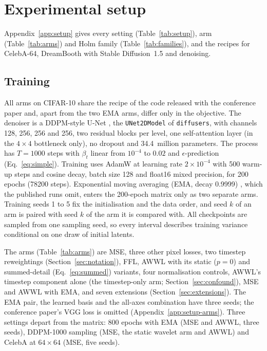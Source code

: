 \section{Experimental setup}
\label{sec:protocol}

Appendix~\ref{app:setup} gives every setting (Table~\ref{tab:setup}), arm
(Table~\ref{tab:arms}) and Holm family (Table~\ref{tab:families}), and the
recipes for CelebA-64, DreamBooth \citep{ruiz2023dreambooth} with Stable
Diffusion~1.5 \citep{rombach2022high} and denoising.

\subsection{Training}
\label{sec:setup-training}

All arms on CIFAR-10 \citep{krizhevsky2009learning} share the recipe of the
code released with the conference paper \citep{thao2026awwl} and, apart from
the two EMA arms, differ only in the objective. The denoiser is a DDPM-style
U-Net \citep{ho2020denoising}, the \texttt{UNet2DModel} of \texttt{diffusers},
with channels 128, 256, 256 and 256, two residual blocks per level, one
self-attention layer (in the $4\times4$ bottleneck only), no dropout and
34.4~million parameters. The process has $T = 1000$ steps with $\beta_t$
linear from $10^{-4}$ to $0.02$ and $\epsilon$-prediction
(Eq.~\eqref{eq:simple}). Training uses AdamW \citep{loshchilov2019decoupled}
at learning rate $2\times10^{-4}$ with 500 warm-up steps and cosine decay,
batch size 128 and float16 mixed precision, for 200 epochs (\num{78200}
steps). Exponential moving averaging (EMA, decay 0.9999)
\citep{polyak1992acceleration}, which the published runs omit, enters the
200-epoch matrix only as two separate arms. Training seeds 1 to 5 fix the
initialisation and the data order, and seed $k$ of an arm is paired with seed
$k$ of the arm it is compared with. All checkpoints are sampled from one
sampling seed, so every interval describes training variance conditional on
one draw of initial latents.

The arms (Table~\ref{tab:arms}) are MSE, three other pixel losses, two
timestep reweightings (Section~\ref{sec:notation}), FFL, AWWL with its static
($p = 0$) and summed-detail (Eq.~\eqref{eq:summed}) variants, four
normalisation controls, AWWL's timestep component alone (the timestep-only
arm; Section~\ref{sec:confound}), MSE and AWWL with EMA, and seven extensions
(Section~\ref{sec:extensions}). The EMA pair, the learned basis and the
all-axes combination have three seeds; the conference paper's VGG loss is
omitted (Appendix~\ref{app:setup-arms}). Three settings depart from the
matrix: 800 epochs with EMA (MSE and AWWL, three seeds), DDPM-1000 sampling
(MSE, the static wavelet arm and AWWL) and CelebA \citep{liu2015deep} at
$64\times64$ (MSE, five seeds).

